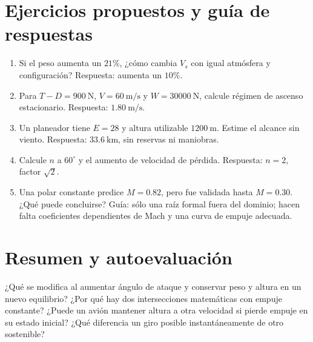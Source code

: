 \section{Ejercicios propuestos y guía de respuestas}
\begin{enumerate}
\item Si el peso aumenta un $21\%$, ¿cómo cambia $V_s$ con igual atmósfera y configuración? Respuesta: aumenta un $10\%$.
\item Para $T-D=900\ \mathrm N$, $V=60\ \mathrm{m/s}$ y $W=30000\ \mathrm N$, calcule régimen de ascenso estacionario. Respuesta: $1.80\ \mathrm{m/s}$.
\item Un planeador tiene $E=28$ y altura utilizable $1200\ \mathrm m$. Estime el alcance sin viento. Respuesta: $33.6\ \mathrm{km}$, sin reservas ni maniobras.
\item Calcule $n$ a $60^\circ$ y el aumento de velocidad de pérdida. Respuesta: $n=2$, factor $\sqrt2$.
\item Una polar constante predice $M=0.82$, pero fue validada hasta $M=0.30$. ¿Qué puede concluirse? Guía: sólo una raíz formal fuera del dominio; hacen falta coeficientes dependientes de Mach y una curva de empuje adecuada.
\end{enumerate}
\section{Resumen y autoevaluación}
¿Qué se modifica al aumentar ángulo de ataque y conservar peso y altura en un nuevo equilibrio? ¿Por qué hay dos intersecciones matemáticas con empuje constante? ¿Puede un avión mantener altura a otra velocidad si pierde empuje en su estado inicial? ¿Qué diferencia un giro posible instantáneamente de otro sostenible?

